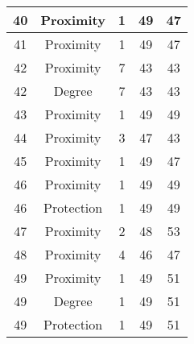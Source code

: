 \documentclass[results.tex]{subfiles}
\begin{document}
\begin{center}
\begin{tabular}{| c || c | c | c | c |}
            \hline
            40                      & Proximity                    & 1                      & 49                      & 47                   \\
            \hline
            41                      & Proximity                    & 1                      & 49                      & 47                   \\
            \hline
            42                      & Proximity                    & 7                      & 43                      & 43                   \\
            \hline
            42                      & Degree                       & 7                      & 43                      & 43                   \\
            \hline
            43                      & Proximity                    & 1                      & 49                      & 49                   \\
            \hline
            44                      & Proximity                    & 3                      & 47                      & 43                   \\
            \hline
            45                      & Proximity                    & 1                      & 49                      & 47                   \\
            \hline
            46                      & Proximity                    & 1                      & 49                      & 49                   \\
            \hline
            46                      & Protection                   & 1                      & 49                      & 49                   \\
            \hline
            47                      & Proximity                    & 2                      & 48                      & 53                   \\
            \hline
            48                      & Proximity                    & 4                      & 46                      & 47                   \\
            \hline
            49                      & Proximity                    & 1                      & 49                      & 51                   \\
            \hline
            49                      & Degree                       & 1                      & 49                      & 51                   \\
            \hline
            49                      & Protection                   & 1                      & 49                      & 51                   \\
            \hline
        \end{tabular}
    \end{center}
\end{document}
